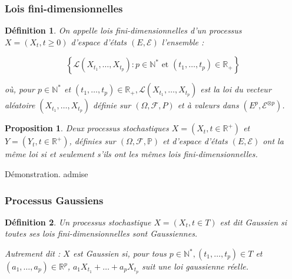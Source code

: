 \documentclass[A4paper,12pt]{report}
\newtheorem{proposition}{Proposition}[chapter]
\newtheorem{definition}{D\'efinition}[chapter]
\newcommand{\pr}{{\mathbb{P}}}
\begin{document}
\subsubsection{Lois fini-dimensionnelles}
\begin{definition}
On appelle lois fini-dimensionnelles d'un processus $X=\left(X_{t}, t \geq 0\right)$ d'espace d'états $(E, \mathscr{E})$ l'ensemble :

$$
\left\{\mathcal{L}\left(X_{t_{1}}, \ldots, X_{t_{p}}\right): p \in \mathbb{N}^{*} \text { et }\left(t_{1}, \ldots, t_{p}\right) \in \mathbb{R}_{+}\right\}
$$

où, pour $p \in \mathbb{N}^{*}$ et $\left(t_{1}, \ldots, t_{p}\right) \in \mathbb{R}_{+}, \mathcal{L}\left(X_{t_{1}}, \ldots, X_{t_{p}}\right)$ est la loi du vecteur aléatoire $\left(X_{t_{1}}, \ldots, X_{t_{p}}\right)$ définie sur $(\Omega, \mathcal{F}, P)$ et à valeurs dans 
$\left(E^{p}, \mathscr{E}^{\otimes p}\right)$.

\end{definition}
\begin{proposition}
Deux processus stochastiques $X=\left(X_{t}, t \in \mathbb{R}^{+}\right)$ et $Y=\left(Y_{t}, t \in \mathbb{R}^{+}\right)$, définies sur $(\Omega, \mathcal{F}, \pr )$ et d'espace d'états $(E, \mathscr{E})$ ont la même loi si et seulement s'ils ont les mêmes lois fini-dimensionnelles. 
\end{proposition}
Démonstration. admise

\subsubsection{Processus Gaussiens}

\begin{definition}
Un processus stochastique $X=\left(X_{t}, t \in T\right)$ est dit Gaussien si toutes ses lois fini-dimensionnelles sont Gaussiennes.

Autrement dit : $X$ est Gaussien si, pour tous $p \in \mathbb{N}^{*},\left(t_{1}, \ldots, t_{p}\right) \in T$ et $\left(a_{1}, \ldots, a_{p}\right) \in \mathbb{R}^{p}$, $a_{1} X_{t_{1}}+\ldots+a_{p} X_{t_{p}}$ suit une loi gaussienne réelle.

\end{definition}
\end{document}
